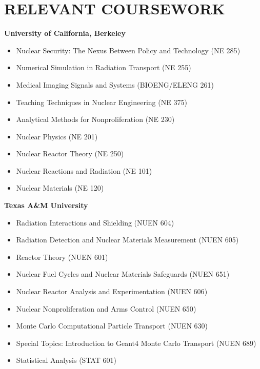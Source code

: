 \section{\small{RELEVANT COURSEWORK}}

\textbf{University of California, Berkeley}\\[-2.3ex]
\begin{itemize}[leftmargin=4ex] \itemsep -2pt
\item Nuclear Security: The Nexus Between Policy and Technology ({\footnotesize{NE 285}})
\item Numerical Simulation in Radiation Transport ({\footnotesize{NE 255}})
\item Medical Imaging  Signals and Systems ({\footnotesize{BIOENG/ELENG 261}})
\item Teaching Techniques in Nuclear Engineering ({\footnotesize{NE 375}})
\item Analytical Methods for Nonproliferation ({\footnotesize{NE 230}})
\item Nuclear Physics ({\footnotesize{NE 201}})
\item Nuclear Reactor Theory ({\footnotesize{NE 250}})
\item Nuclear Reactions and Radiation ({\footnotesize{NE 101}})
\item Nuclear Materials ({\footnotesize{NE 120}})
\end{itemize}

\textbf{Texas A\&M University}\\[-2.3ex]
\begin{itemize}[leftmargin=4ex] \itemsep -2pt
\item Radiation Interactions and Shielding ({\footnotesize{NUEN 604}})
\item Radiation Detection and Nuclear Materials Measurement ({\footnotesize{NUEN 605}})
\item Reactor Theory ({\footnotesize{NUEN 601}})
\item Nuclear Fuel Cycles and Nuclear Materials Safeguards ({\footnotesize{NUEN 651}})
\item Nuclear Reactor Analysis and Experimentation ({\footnotesize{NUEN 606}})
\item Nuclear Nonproliferation and Arms Control ({\footnotesize{NUEN 650}})
\item Monte Carlo Computational Particle Transport ({\footnotesize{NUEN 630}})
\item Special Topics: Introduction to Geant4 Monte Carlo Transport ({\footnotesize{NUEN 689}})
\item Statistical Analysis ({\footnotesize{STAT 601}})
\end{itemize}

